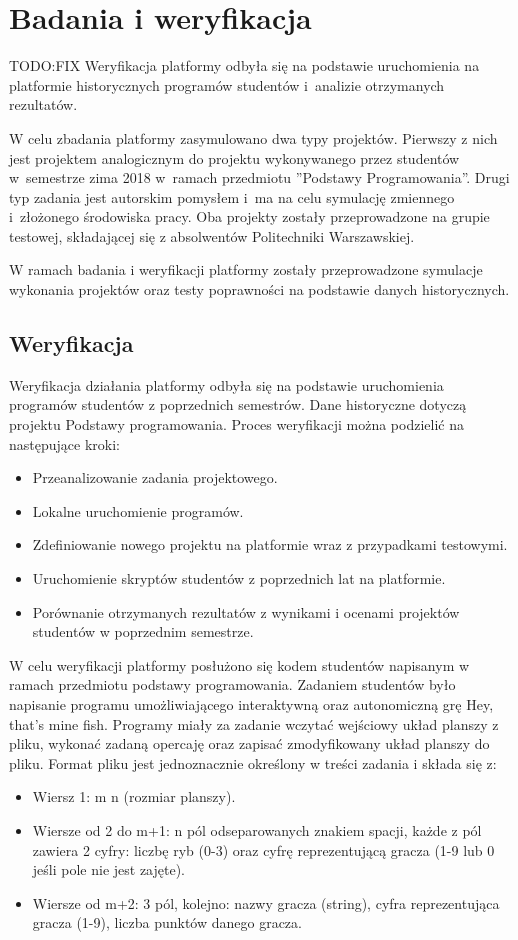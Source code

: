 \chapter{Badania i weryfikacja}
\label{chapter:research}
TODO:FIX
Weryfikacja platformy odbyła się na podstawie uruchomienia na platformie historycznych programów studentów i~analizie otrzymanych rezultatów.

W celu zbadania platformy zasymulowano dwa typy projektów.
Pierwszy z nich jest projektem analogicznym do projektu wykonywanego przez studentów w~semestrze zima 2018 w~ramach przedmiotu ”Podstawy Programowania”.
Drugi typ zadania jest autorskim pomysłem i~ma na celu symulację zmiennego i~złożonego środowiska pracy.
Oba projekty zostały przeprowadzone na grupie testowej, składającej się z absolwentów Politechniki Warszawskiej.

W ramach badania i weryfikacji platformy zostały przeprowadzone symulacje wykonania projektów oraz testy poprawności na podstawie danych historycznych.

\section{Weryfikacja}

Weryfikacja działania platformy odbyła się na podstawie uruchomienia programów studentów z poprzednich semestrów.
Dane historyczne dotyczą projektu Podstawy programowania.
Proces weryfikacji można podzielić na następujące kroki:
\begin{itemize}
    \item Przeanalizowanie zadania projektowego.
    \item Lokalne uruchomienie programów.
    \item Zdefiniowanie nowego projektu na platformie wraz z przypadkami testowymi.
    \item Uruchomienie skryptów studentów z poprzednich lat na platformie.
    \item Porównanie otrzymanych rezultatów z wynikami i ocenami projektów studentów w poprzednim semestrze.
\end{itemize}

W celu weryfikacji platformy posłużono się kodem studentów napisanym w ramach przedmiotu podstawy programowania.
Zadaniem studentów było napisanie programu umożliwiającego interaktywną oraz autonomiczną grę Hey, that’s mine fish.
Programy miały za zadanie wczytać wejściowy układ planszy z pliku, wykonać zadaną opercaję oraz zapisać zmodyfikowany układ planszy do pliku.
Format pliku jest jednoznacznie określony w treści zadania i składa się z:
\begin{itemize}
    \item Wiersz 1: m n (rozmiar planszy).
    \item Wiersze od 2 do m+1: n pól odseparowanych znakiem spacji, każde z pól zawiera 2 cyfry: liczbę ryb (0-3) oraz cyfrę reprezentującą gracza (1-9 lub 0 jeśli pole nie jest zajęte).
    \item Wiersze od m+2: 3 pól, kolejno: nazwy gracza (string), cyfra reprezentująca gracza (1-9), liczba punktów danego gracza.
\end{itemize}

